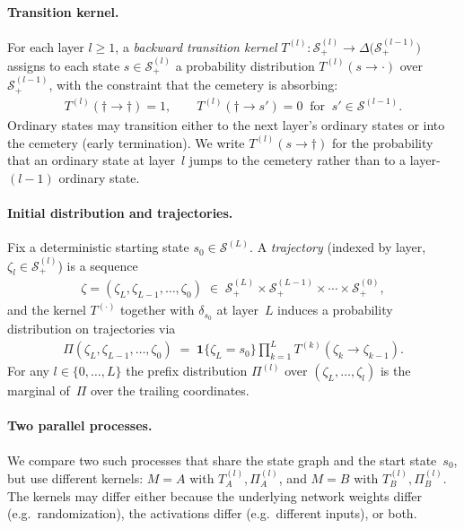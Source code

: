 \documentclass[twoside]{article}
\newcommand{\1}{\mathbf{1}}
\begin{document}
\paragraph{Transition kernel.}
For each layer $l \geq 1$, a \emph{backward transition kernel} $T^{(l)} : \mathcal{S}^{(l)}_+ \to
    \Delta\bigl(\mathcal{S}^{(l-1)}_+\bigr)$ assigns to each state $s \in \mathcal{S}^{(l)}_+$ a
probability distribution $T^{(l)}(s \to \cdot)$ over $\mathcal{S}^{(l-1)}_+$, with the constraint
that the cemetery is absorbing:
\begin{align}\label{eq:cemetery-absorbing}
    T^{(l)}(\dagger \to \dagger) = 1, \qquad T^{(l)}(\dagger \to s') = 0 \;\;\text{for}\;\; s' \in
    \mathcal{S}^{(l-1)}.
\end{align}
Ordinary states may transition either to the next layer's ordinary states or into the cemetery
(early termination).  We write $T^{(l)}(s \to \dagger)$ for the probability that an ordinary state
at layer~$l$ jumps to the cemetery rather than to a layer-$(l{-}1)$ ordinary state.

\paragraph{Initial distribution and trajectories.}
Fix a deterministic starting state $s_0 \in \mathcal{S}^{(L)}$.  A \emph{trajectory} (indexed by
layer, $\zeta_l \in \mathcal{S}^{(l)}_+$) is a sequence
\begin{align}
    \zeta = (\zeta_L, \zeta_{L-1}, \ldots, \zeta_0) \;\in\; \mathcal{S}^{(L)}_+ \times
    \mathcal{S}^{(L-1)}_+ \times \cdots \times \mathcal{S}^{(0)}_+,
\end{align}
and the kernel $T^{(\cdot)}$ together with $\delta_{s_0}$ at layer~$L$ induces a probability
distribution on trajectories via
\begin{align}\label{eq:path-measure}
    \Pi(\zeta_L, \zeta_{L-1}, \ldots, \zeta_0) \;=\; \mathbf{1}\{\zeta_L = s_0\} \prod_{k=1}^{L}
    T^{(k)}(\zeta_k \to \zeta_{k-1}).
\end{align}
For any $l \in \{0,\ldots,L\}$ the prefix distribution $\Pi^{(l)}$ over $(\zeta_L, \ldots,
    \zeta_l)$ is the marginal of~$\Pi$ over the trailing coordinates.

\paragraph{Two parallel processes.}
We compare two such processes that share the state graph and the start state~$s_0$, but use
different kernels: $M = A$ with $T^{(l)}_A, \Pi_A^{(l)}$, and $M = B$ with $T^{(l)}_B,
    \Pi_B^{(l)}$.
The kernels may differ either because the underlying network weights differ (e.g.\ randomization),
the activations differ (e.g.\ different inputs), or both.
\end{document}
